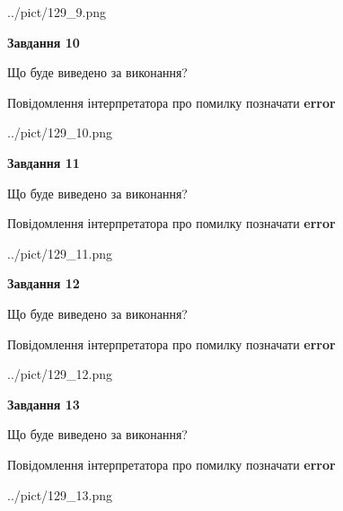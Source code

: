 \documentclass[11pt, ukrainian]{article}
\begin{document}
{\begin {large}
\begin{center}
	{../pict/129_9.png}
\end{center}
\newpage

{\begin {center}\textbf{Завдання 10}\end {center}}\par
Що буде виведено за виконання? \par
Повідомлення інтерпретатора про помилку позначати \textbf{error}

\begin{center}
	{../pict/129_10.png}
\end{center}
\newpage

{\begin {center}\textbf{Завдання 11}\end {center}}\par
Що буде виведено за виконання? \par
Повідомлення інтерпретатора про помилку позначати \textbf{error}

\begin{center}
	{../pict/129_11.png}
\end{center}
\newpage

{\begin {center}\textbf{Завдання 12}\end {center}}\par
Що буде виведено за виконання? \par
Повідомлення інтерпретатора про помилку позначати \textbf{error}

\begin{center}
	{../pict/129_12.png}
\end{center}
\newpage

{\begin {center}\textbf{Завдання 13}\end {center}}\par
Що буде виведено за виконання? \par
Повідомлення інтерпретатора про помилку позначати \textbf{error}

\begin{center}
	{../pict/129_13.png}
\end{center}
\newpage


\end{large}}
\end{document}
